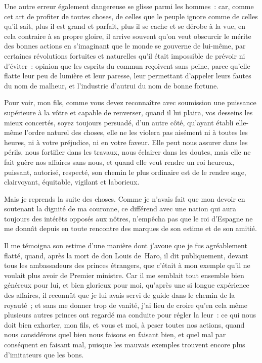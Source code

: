\documentclass[french,twoside]{book} %
\begin{document}
Une autre erreur également dangereuse se glisse parmi les hommes : car, comme cet art de profiter de toutes choses, de celles que le peuple ignore comme de celles qu’il sait, plus il est grand et parfait, plus il se cache et se dérobe à la vue, en cela contraire à sa propre gloire, il arrive souvent qu’on veut obscurcir le mérite des bonnes actions en s’imaginant que le monde se gouverne de lui-même, par certaines révolutions fortuites et naturelles qu’il était impossible de prévoir ni d’éviter : opinion que les esprits du commun reçoivent sans peine, parce qu’elle flatte leur peu de lumière et leur paresse, leur permettant d’appeler leurs fautes du nom de malheur, et l’industrie d’autrui du nom de bonne fortune.\par
Pour voir, mon fils, comme vous devez reconnaître avec soumission une puissance supérieure à la vôtre et capable de renverser, quand il lui plaira, vos desseins les mieux concertés, soyez toujours persuadé, d’un autre côté, qu’ayant établi elle-même l’ordre naturel des choses, elle ne les violera pas aisément ni à toutes les heures, ni à votre préjudice, ni en votre faveur. Elle peut nous assurer dans les périls, nous fortifier dans les travaux, nous éclairer dans les doutes, mais elle ne fait guère nos affaires sans nous, et quand elle veut rendre un roi heureux, puissant, autorisé, respecté, son chemin le plus ordinaire est de le rendre sage, clairvoyant, équitable, vigilant et laborieux.\par
Mais je reprends la suite des choses. Comme je n’avais fait que mon devoir en soutenant la dignité de ma couronne, ce différend avec une nation qui aura toujours des intérêts opposés aux nôtres, n’empêcha pas que le roi d’Espagne ne me donnât depuis en toute rencontre des marques de son estime et de son amitié.\par
Il me témoigna son estime d’une manière dont j’avoue que je fus agréablement flatté, quand, après la mort de don Louis de Haro, il dit publiquement, devant tous les ambassadeurs des princes étrangers, que c’était à mon exemple qu’il ne voulait plus avoir de Premier ministre. Car il me semblait tout ensemble bien généreux pour lui, et bien glorieux pour moi, qu’après une si longue expérience des affaires, il reconnût que je lui avais servi de guide dans le chemin de la royauté ; et sans me donner trop de vanité, j’ai lieu de croire qu’en cela même plusieurs autres princes ont regardé ma conduite pour régler la leur : ce qui nous doit bien exhorter, mon fils, et vous et moi, à peser toutes nos actions, quand nous considérons quel bien nous faisons en faisant bien, et quel mal par conséquent en faisant mal, puisque les mauvais exemples trouvent encore plus d’imitateurs que les bons.\par
\end{document}
